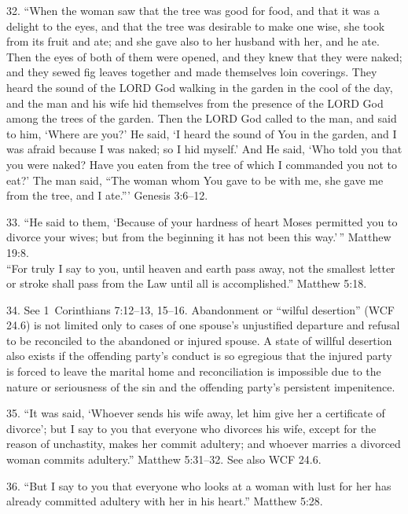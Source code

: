 \documentclass[
]{book}
\begin{document}
32. ``When the woman saw that the tree was good for food, and that it was a delight to the eyes, and that the tree was desirable to make one wise, she took from its fruit and ate; and she gave also to her husband with her, and he ate. Then the eyes of both of them were opened, and they knew that they were naked; and they sewed fig leaves together and made themselves loin coverings. They heard the sound of the LORD God walking in the garden in the cool of the day, and the man and his wife hid themselves from the presence of the LORD God among the trees of the garden. Then the LORD God called to the man, and said to him, `Where are you?' He said, `I heard the sound of You in the garden, and I was afraid because I was naked; so I hid myself.' And He said, `Who told you that you were naked? Have you eaten from the tree of which I commanded you not to eat?' The man said, ``The woman whom You gave to be with me, she gave me from the tree, and I ate.''' Genesis 3:6--12.

33. ``He said to them, `Because of your hardness of heart Moses permitted you to divorce your wives; but from the beginning it has not been this way.'\,'' Matthew 19:8.\\
\hspace*{0.333em}\hspace*{0.333em}\hspace*{0.333em}\hspace*{0.333em}``For truly I say to you, until heaven and earth pass away, not the smallest letter or stroke shall pass from the Law until all is accomplished.'' Matthew 5:18.

34. See 1~Corinthians 7:12--13, 15--16. Abandonment or ``wilful desertion'' (WCF 24.6) is not limited only to cases of one spouse's unjustified departure and refusal to be reconciled to the abandoned or injured spouse. A state of willful desertion also exists if the offending party's conduct is so egregious that the injured party is forced to leave the marital home and reconciliation is impossible due to the nature or seriousness of the sin and the offending party's persistent impenitence.

35. ``It was said, `Whoever sends his wife away, let him give her a certificate of divorce'; but I say to you that everyone who divorces his wife, except for the reason of unchastity, makes her commit adultery; and whoever marries a divorced woman commits adultery.'' Matthew 5:31--32. See also WCF 24.6.

36. ``But I say to you that everyone who looks at a woman with lust for her has already committed adultery with her in his heart.'' Matthew 5:28.
\end{document}
